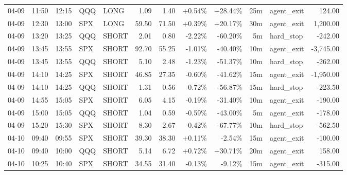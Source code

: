 \documentclass[11pt,a4paper]{article}
\begin{document}
\begin{center}
\begin{longtable}{>{\color{txtmain}}l l l l l r r r r r >{\color{txtmain}}l r}
04-09 & 11:50 & 12:15 & QQQ & LONG & 1.09 & 1.40 & \textcolor{wingreen}{+0.54\%} & \textcolor{wingreen}{+28.44\%} & 25m & agent\_exit & \textcolor{wingreen}{124.00} \\
04-09 & 12:30 & 13:00 & SPX & LONG & 59.50 & 71.50 & \textcolor{wingreen}{+0.39\%} & \textcolor{wingreen}{+20.17\%} & 30m & agent\_exit & \textcolor{wingreen}{1,200.00} \\
04-09 & 13:20 & 13:25 & QQQ & SHORT & 2.01 & 0.80 & \textcolor{lossred}{-2.22\%} & \textcolor{lossred}{-60.20\%} & 5m & hard\_stop & \textcolor{lossred}{-242.00} \\
04-09 & 13:45 & 13:55 & SPX & SHORT & 92.70 & 55.25 & \textcolor{lossred}{-1.01\%} & \textcolor{lossred}{-40.40\%} & 10m & agent\_exit & \textcolor{lossred}{-3,745.00} \\
04-09 & 13:45 & 13:55 & QQQ & SHORT & 5.10 & 2.48 & \textcolor{lossred}{-1.23\%} & \textcolor{lossred}{-51.37\%} & 10m & hard\_stop & \textcolor{lossred}{-262.00} \\
04-09 & 14:10 & 14:25 & SPX & SHORT & 46.85 & 27.35 & \textcolor{lossred}{-0.60\%} & \textcolor{lossred}{-41.62\%} & 15m & agent\_exit & \textcolor{lossred}{-1,950.00} \\
04-09 & 14:10 & 14:25 & QQQ & SHORT & 1.31 & 0.56 & \textcolor{lossred}{-0.72\%} & \textcolor{lossred}{-56.87\%} & 15m & hard\_stop & \textcolor{lossred}{-223.50} \\
04-09 & 14:55 & 15:05 & SPX & SHORT & 6.05 & 4.15 & \textcolor{lossred}{-0.19\%} & \textcolor{lossred}{-31.40\%} & 10m & agent\_exit & \textcolor{lossred}{-190.00} \\
04-09 & 15:00 & 15:05 & QQQ & SHORT & 1.04 & 0.59 & \textcolor{lossred}{-0.59\%} & \textcolor{lossred}{-43.00\%} & 5m & agent\_exit & \textcolor{lossred}{-178.00} \\
04-09 & 15:20 & 15:30 & SPX & SHORT & 8.30 & 2.67 & \textcolor{lossred}{-0.42\%} & \textcolor{lossred}{-67.77\%} & 10m & hard\_stop & \textcolor{lossred}{-562.50} \\
04-10 & 09:40 & 09:55 & SPX & SHORT & 39.30 & 38.30 & \textcolor{wingreen}{+0.11\%} & \textcolor{lossred}{-2.54\%} & 15m & agent\_exit & \textcolor{lossred}{-100.00} \\
04-10 & 09:40 & 10:00 & QQQ & SHORT & 5.14 & 6.72 & \textcolor{wingreen}{+0.72\%} & \textcolor{wingreen}{+30.71\%} & 20m & agent\_exit & \textcolor{wingreen}{158.00} \\
04-10 & 10:25 & 10:40 & SPX & SHORT & 34.55 & 31.40 & \textcolor{lossred}{-0.13\%} & \textcolor{lossred}{-9.12\%} & 15m & agent\_exit & \textcolor{lossred}{-315.00} \\

\end{longtable}
\end{center}
\end{document}
